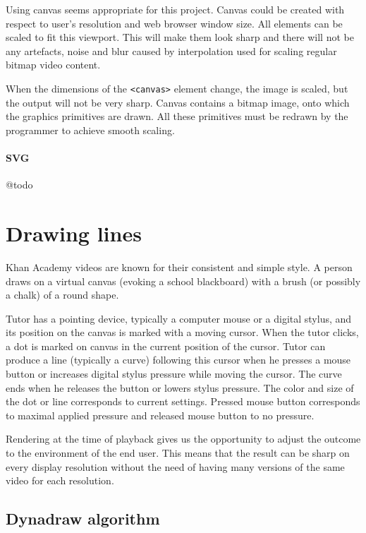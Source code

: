 Using canvas seems appropriate for this project. Canvas could be created with respect to user's resolution and web browser window size. All elements can be scaled to fit this viewport. This will make them look sharp and there will not be any artefacts, noise and blur caused by interpolation used for scaling regular bitmap video content.

When the dimensions of the \verb|<canvas>| element change, the image is scaled, but the output will not be very sharp. Canvas contains a bitmap image, onto which the graphics primitives are drawn. All these primitives must be redrawn by the programmer to achieve smooth scaling.

\paragraph{SVG} @todo










\section{Drawing lines}
Khan Academy videos are known for their consistent and simple style. A person draws on a virtual canvas (evoking a school blackboard) with a brush (or possibly a chalk) of a round shape.

Tutor has a pointing device, typically a computer mouse or a digital stylus, and its position on the canvas is marked with a moving cursor. When the tutor clicks, a dot is marked on canvas in the current position of the cursor. Tutor can produce a line (typically a curve) following this cursor when he presses a mouse button or increases digital stylus pressure while moving the cursor. The curve ends when he releases the button or lowers stylus pressure. The color and size of the dot or line corresponds to current settings. Pressed mouse button corresponds to maximal applied pressure and released mouse button to no pressure.

Rendering at the time of playback gives us the opportunity to adjust the outcome to the environment of the end user. This means that the result can be sharp on every display resolution without the need of having many versions of the same video for each resolution.

\subsection{Dynadraw algorithm}
\label{sec:dynadraw}


